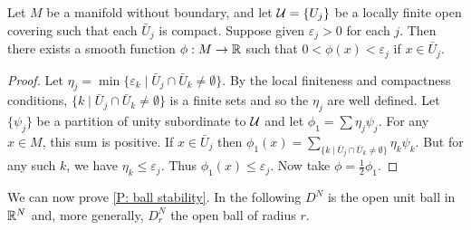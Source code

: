 \begin{lemma}\label{L: minimizer}
Let $M$ be a manifold without boundary, and let $\mathcal{U}=\{U_j\}$ be a locally finite open covering such that each $\bar U_j$ is compact. Suppose given $\varepsilon_j>0$ for each $j$. Then there exists a smooth function $\phi:M\to \mathbb{R}$ such that $0<\phi(x)<\varepsilon_j$ if $x\in \bar U_j$. 
\end{lemma}
\begin{proof}
Let $\eta_j=\min\{\varepsilon_k\mid \bar U_j\cap \bar U_k\neq \emptyset\}$. By the local finiteness and compactness conditions, $\{k\mid \bar U_j\cap \bar U_k\neq \emptyset\}$ is a finite sets and so the $\eta_j$ are well defined. Let $\{\psi_j\}$ be a partition of unity subordinate to $\mathcal{U}$ and let $\phi_1=\sum \eta_j\psi_j$. For any $x\in M$, this sum is positive. If $x\in \bar U_j$ then $\phi_1(x)=\sum_{\{k\mid \bar U_j\cap \bar U_k\neq \emptyset\}} \eta_k\psi_k$. But for any such $k$, we have $\eta_k\leq \varepsilon_j$. Thus $\phi_1(x)\leq \varepsilon_j$. Now take $\phi=\frac{1}{2}\phi_1$. 
\end{proof}



We can now prove \cref{P: ball stability}. 
In the following $D^N$ is the open unit ball in $\mathbb{R}^N$ and, more generally, $D^N_r$ the open ball of radius $r$. 



